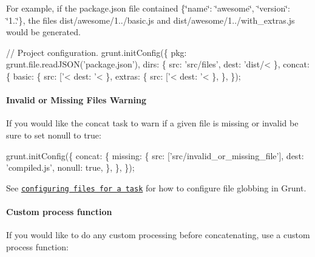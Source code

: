 For example, if the {\ttfamily package.\+json} file contained {\ttfamily \{\char`\"{}name\char`\"{}\+: \char`\"{}awesome\char`\"{}, \char`\"{}version\char`\"{}\+: \char`\"{}1..\char`\"{}\}}, the files {\ttfamily dist/awesome/1../basic.js} and {\ttfamily dist/awesome/1../with\+\_\+extras.js} would be generated.


\begin{DoxyCode}
// Project configuration.
grunt.initConfig(\{
  pkg: grunt.file.readJSON('package.json'),
  dirs: \{
    src: 'src/files',
    dest: 'dist/<%
  \},
  concat: \{
    basic: \{
      src: ['<%
      dest: '<%
    \},
    extras: \{
      src: ['<%
      dest: '<%
    \},
  \},
\});
\end{DoxyCode}


\paragraph*{Invalid or Missing Files Warning}

If you would like the {\ttfamily concat} task to warn if a given file is missing or invalid be sure to set {\ttfamily nonull} to {\ttfamily true}\+:


\begin{DoxyCode}
grunt.initConfig(\{
  concat: \{
    missing: \{
      src: ['src/invalid\_or\_missing\_file'],
      dest: 'compiled.js',
      nonull: true,
    \},
  \},
\});
\end{DoxyCode}


See \href{http://gruntjs.com/configuring-tasks#files}{\tt configuring files for a task} for how to configure file globbing in Grunt.

\paragraph*{Custom process function}

If you would like to do any custom processing before concatenating, use a custom process function\+:




